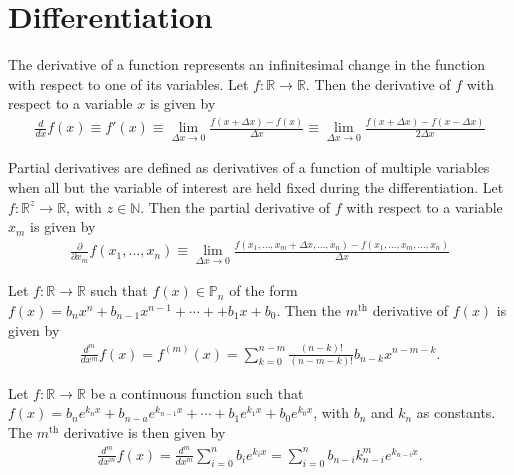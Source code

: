 \section{Differentiation}
\begin{defn}{1}
	The derivative of a function represents an infinitesimal change in the function with respect to one of its variables. Let $f:\mathbb{R}\rightarrow\mathbb{R}$. Then the derivative of $f$ with respect to a variable $x$ is given by
	\begin{align}
	\frac{d}{dx}f(x)\equiv f'(x) \equiv\lim\limits_{\Delta x \rightarrow 0}\frac{f(x+\Delta x)-f(x)}{\Delta x} \equiv \lim\limits_{\Delta x \rightarrow 0}\frac{f(x+\Delta x)-f(x-\Delta x)}{2\Delta x}
	\end{align}
\end{defn} 
\begin{defn}{1}
	Partial derivatives are defined as derivatives of a function of multiple variables when all but the variable of interest are held fixed during the differentiation. Let $f:\mathbb{R}^z\rightarrow\mathbb{R}$, with $z \in \mathbb{N}$. Then the partial derivative of $f$ with respect to a variable $x_m$ is given by
	\begin{align}
	\frac{\partial}{\partial x_m}f(x_1,\dots,x_n) \equiv \lim\limits_{\Delta x \rightarrow 0}\frac{f(x_1,\dots,x_m+\Delta x, \dots,x_n)-f(x_1,\dots,x_m,\dots,x_n)}{\Delta x}
	\end{align}
\end{defn}
\begin{fancybox}{}
	Let $f:\mathbb{R}\rightarrow\mathbb{R}$ such that $f(x)\in\mathbb{P}_n$ of the form $f(x)=b_nx^n+b_{n-1}x^{n-1}+\cdots++b_1x+b_0$. Then the $m^{\textrm{th}}$ derivative of $f(x)$ is given by
	\begin{align}
	\frac{d^m}{dx^m}f(x)=f^{(m)}(x)=\sum_{k=0}^{n-m}\frac{(n-k)!}{(n-m-k)!}b_{n-k}x^{n-m-k}.
	\end{align}
\end{fancybox}
\begin{fancybox}{}
	Let $f:\mathbb{R}\rightarrow\mathbb{R}$ be a continuous function such that $f(x)=b_n e^{k_n x}+b_{n-a}e^{k_{n-1}x}+\cdots+b_1e^{k_1x}+b_0e^{k_0x}$, with $b_n$ and $k_n$ as constants. The $m^\textrm{th}$ derivative is then given by
	\begin{align}
	\frac{d^m}{dx^m}f(x)=\frac{d^m}{dx^m}\sum_{i=0}^{n}b_ie^{k_ix}=\sum_{i=0}^{n}b_{n-i} k_{n-i}^m e^{k_{n-i} x}.
	\end{align}
\end{fancybox}
